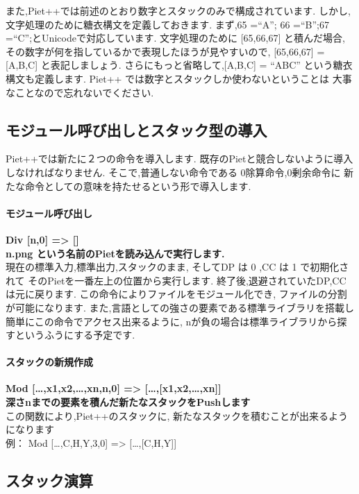 また,Piet++では前述のとおり数字とスタックのみで構成されています.
しかし,文字処理のために糖衣構文を定義しておきます. まず,65 =``A''; 66
=``B'';67 =``C'';とUnicodeで対応しています. 文字処理のために
{[}65,66,67{]} と積んだ場合,
その数字が何を指しているかで表現したほうが見やすいので, {[}65,66,67{]} =
{[}A,B,C{]} と表記しましょう. さらにもっと省略して,{[}A,B,C{]} = ``ABC''
という糖衣構文も定義します. Piet++
では数字とスタックしか使わないということは
大事なことなので忘れないでください.　　

\subsection{モジュール呼び出しとスタック型の導入}

Piet++では新たに２つの命令を導入します.
既存のPietと競合しないように導入しなければなりません.
そこで,普通しない命令である 0除算命令,0剰余命令に
新たな命令としての意味を持たせるという形で導入します.

\paragraph{モジュール呼び出し}

\textbf{Div {[}n,0{]} =\textgreater{} {[}{]}}\\\textbf{n.png
という名前のPietを読み込んで実行します.}\\現在の標準入力,標準出力,スタックのまま,
そしてDP は 0 ,CC は 1 で初期化されて
そのPietを一番左上の位置から実行します.
終了後,退避されていたDP,CCは元に戻ります.
この命令によりファイルをモジュール化でき,
ファイルの分割が可能になります.
また,言語としての強さの要素である標準ライブラリを搭載し
簡単にこの命令でアクセス出来るように,
nが負の場合は標準ライブラリから探すというふうにする予定です.

\paragraph{スタックの新規作成}

\textbf{Mod {[}\ldots{},x1,x2,\ldots{},xn,n,0{]} =\textgreater{}
{[}\ldots{},{[}x1,x2,\ldots{},xn{]}{]}}\\\textbf{深さnまでの要素を積んだ新たなスタックをPushします}\\この関数により,Piet++のスタックに,
新たなスタックを積むことが出来るようになります\\例： Mod
{[}\ldots{},C,H,Y,3,0{]} =\textgreater{} {[}\ldots{},{[}C,H,Y{]}{]}

\subsection{スタック演算}

